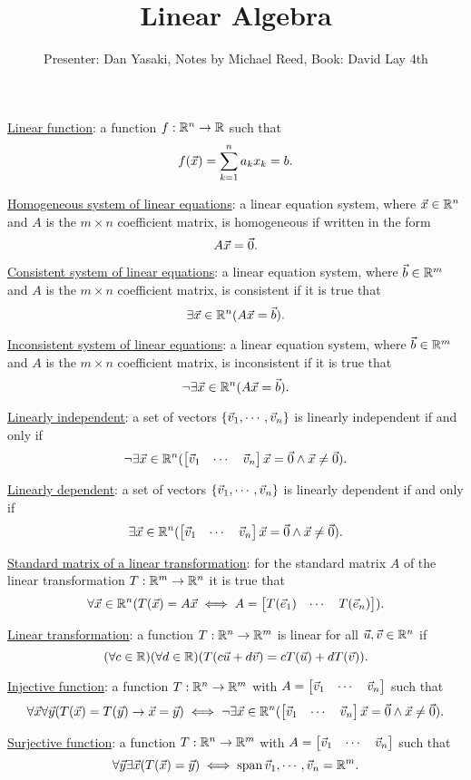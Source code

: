 \documentclass[10pt,a4paper]{article}
\author{Presenter: Dan Yasaki, Notes by Michael Reed, Book: David Lay 4th}
\title{Linear Algebra}
\date{}
\begin{document}
\maketitle

\underline{Linear function}: a function $f: \mathbb{R}^n \rightarrow \mathbb{R}$ such that
$$f(\vec{x}) = \sum_{k=1}^n a_k x_k = b.$$

\underline{Homogeneous system of linear equations}: a linear equation system, where $\vec{x}\in \mathbb{R}^n$ and $A$ is the $m\times n$ coefficient matrix, is homogeneous if written in the form $$A\vec{x}=\vec{0}.$$

\underline{Consistent system of linear equations}: a linear equation system, where $\vec{b}\in \mathbb{R}^m$ and $A$ is the $m\times n$ coefficient matrix, is consistent if it is true that
$$\exists \vec{x}\in\mathbb{R}^n(A\vec{x}=\vec{b}).$$

\underline{Inconsistent system of linear equations}: a linear equation system, where $\vec{b}\in \mathbb{R}^m$ and $A$ is the $m\times n$ coefficient matrix, is inconsistent if it is true that
$$\neg \exists \vec{x} \in \mathbb{R}^n (A\vec{x}=\vec{b}).$$

\underline{Linearly independent}: a set of vectors $\{\vec{v}_1,\cdots,\vec{v}_n\}$ is linearly independent if and only if %
$$\neg \exists \vec{x} \in \mathbb{R}^n ( \begin{bmatrix} \vec{v}_1 & \cdots & \vec{v}_n \end{bmatrix} \vec{x}=\vec{0} \land \vec{x}\neq\vec{0}).$$

\underline{Linearly dependent}: a set of vectors $\{\vec{v}_1,\cdots,\vec{v}_n\}$ is linearly dependent if and only if
$$\exists \vec{x} \in \mathbb{R}^n (\begin{bmatrix} \vec{v}_1 & \cdots & \vec{v}_n \end{bmatrix}\vec{x}=\vec{0} \land \vec{x}\neq \vec{0}).$$

\underline{Standard matrix of a linear transformation}: for the standard matrix $A$ of the linear transformation  $T:\mathbb{R}^m\rightarrow \mathbb{R}^n$ it is true that
$$\forall \vec{x}\in \mathbb{R}^n (T(\vec{x})=A\vec{x} \iff A = \begin{bmatrix} T(\vec{e}_1) & \cdots & T(\vec{e}_n) \end{bmatrix} ).$$

\underline{Linear transformation}: a function $T:\mathbb{R}^n\rightarrow \mathbb{R}^m$ is linear for all $\vec{u},\vec{v}\in \mathbb{R}^n$ if
$$(\forall c \in \mathbb{R} )(\forall d\in \mathbb{R}) (T(c\vec{u}+d\vec{v}) = cT(\vec{u}) + dT(\vec{v})).$$

\underline{Injective function}: a function $T:\mathbb{R}^n \rightarrow \mathbb{R}^m$ with $A = \begin{bmatrix} \vec{v}_1 & \cdots & \vec{v}_n \end{bmatrix}$ such that
$$\forall \vec{x} \forall \vec{y} (T(\vec{x})=T(\vec{y}) \rightarrow \vec{x}=\vec{y})\iff \neg \exists \vec{x} \in \mathbb{R}^n ( \begin{bmatrix} \vec{v}_1 & \cdots & \vec{v}_n \end{bmatrix} \vec{x}=\vec{0} \land \vec{x}\neq\vec{0}).$$

\underline{Surjective function}: a function $T:\mathbb{R}^n \rightarrow \mathbb{R}^m$ with $A = \begin{bmatrix} \vec{v}_1 & \cdots & \vec{v}_n \end{bmatrix}$ such that
$$\forall \vec{y} \exists \vec{x}(T(\vec{x})=\vec{y}) \iff \text{span}\,\vec{v}_1,\cdots,\vec{v}_n = \mathbb{R}^m.$$
\end{document}
